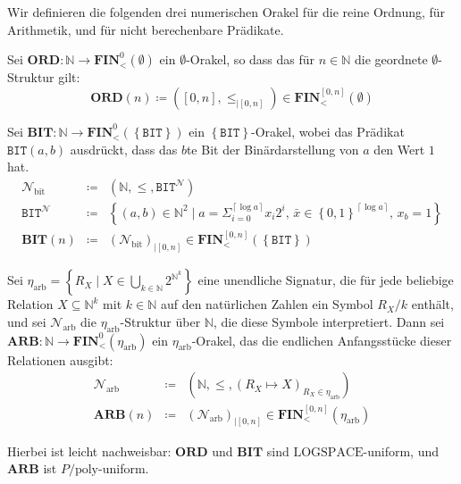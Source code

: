 Wir definieren die folgenden drei numerischen Orakel für die reine
Ordnung, für Arithmetik, und für nicht berechenbare Prädikate.
\begin{defn}
\textbf{\label{def:ord}}Sei $\mathbf{ORD}:\mathbb{N}\rightarrow\mathbf{FIN}_{<}^{0}\left(\emptyset\right)$
ein $\emptyset$-Orakel, so dass das für $n\in\mathbb{N}$ die geordnete
$\emptyset$-Struktur gilt: 
\[
\mathbf{ORD}\left(n\right)\coloneqq\left(\left[0,n\right],\leqslant_{\mid\left[0,n\right]}\right)\in\mathbf{FIN}_{<}^{\left[0,n\right]}\left(\emptyset\right)
\]
\end{defn}

\begin{defn}
\textbf{\label{def:bit}}Sei $\mathbf{BIT}:\mathbb{N}\rightarrow\mathbf{FIN}_{<}^{0}\left(\left\{ \mathtt{BIT}\right\} \right)$
ein $\left\{ \mathtt{BIT}\right\} $-Orakel, wobei das Prädikat $\mathtt{BIT}\left(a,b\right)$
ausdrückt, dass das $b$te Bit der Binärdarstellung von $a$ den Wert
$1$ hat. 
\begin{eqnarray*}
\mathcal{N}_{\mathrm{bit}} & \coloneqq & \left(\mathbb{N},\leqslant,\mathtt{BIT}^{\mathcal{N}}\right)\\
\mathtt{BIT}^{\mathcal{N}} & \coloneqq & \left\{ \left(a,b\right)\in\mathbb{N}^{2}\mid a=\Sigma_{i=0}^{\left\lceil \log a\right\rceil }x_{i}2^{i},\,\bar{x}\in\left\{ 0,1\right\} ^{\left\lceil \log a\right\rceil },\,x_{b}=1\right\} \\
\mathbf{BIT}\left(n\right) & \coloneqq & \left(\mathcal{N}_{\mathrm{bit}}\right)_{\mid\left[0,n\right]}\in\mathbf{FIN}_{<}^{\left[0,n\right]}\left(\left\{ \mathtt{BIT}\right\} \right)
\end{eqnarray*}
\end{defn}

\begin{defn}
\label{def:arb}Sei $\eta_{\mathrm{arb}}=\left\{ R_{X}\mid X\in\bigcup_{k\in\mathbb{N}}2^{\mathbb{N}^{k}}\right\} $
eine unendliche Signatur, die für jede beliebige Relation $X\subseteq\mathbb{N}^{k}$
mit $k\in\mathbb{N}$ auf den natürlichen Zahlen ein Symbol $R_{X}/k$
enthält, und sei $\mathcal{N}_{\mathrm{arb}}$ die $\eta_{\mathrm{arb}}$-Struktur
über $\mathbb{N}$, die diese Symbole interpretiert. Dann sei $\mathbf{ARB}:\mathbb{N}\rightarrow\mathbf{FIN}_{<}^{0}\left(\eta_{\mathrm{arb}}\right)$
ein $\eta_{\mathrm{arb}}$-Orakel, das die endlichen Anfangsstücke
dieser Relationen ausgibt:
\begin{eqnarray*}
\mathcal{N}_{\mathrm{arb}} & \coloneqq & \left(\mathbb{N},\leqslant,\left(R_{X}\mapsto X\right)_{R_{X}\in\eta_{\mathrm{arb}}}\right)\\
\mathbf{ARB}\left(n\right) & \coloneqq & \left(\mathcal{N}_{\mathrm{arb}}\right)_{\mid\left[0,n\right]}\in\mathbf{FIN}_{<}^{\left[0,n\right]}\left(\eta_{\mathrm{arb}}\right)
\end{eqnarray*}

Hierbei ist leicht nachweisbar: $\mathbf{ORD}$ und $\mathbf{BIT}$
sind $\mathrm{LOGSPACE}$-uniform, und $\mathbf{ARB}$ ist $P/\mathrm{poly}$-uniform.
\end{defn}

